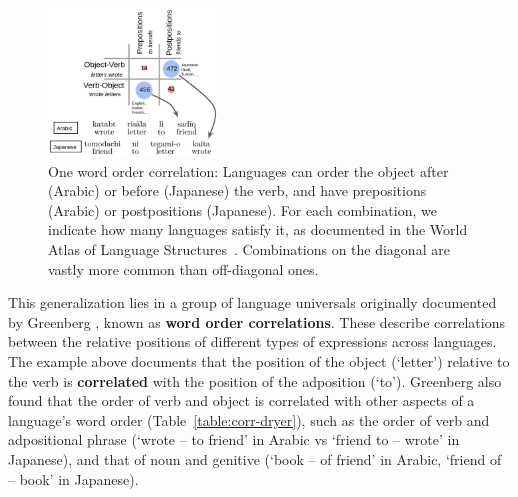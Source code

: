 \documentclass[9pt,twocolumn,twoside,lineno]{pnas-new}
\newcommand{\key}[1]{\textbf{#1}}
\begin{document}
\begin{figure}
    \centering
    \includegraphics[width=0.4\textwidth]{figure1.pdf}
\caption{ One word order correlation: Languages can order the object after (Arabic) or before (Japanese) the verb, and have prepositions (Arabic) or postpositions (Japanese). For each combination, we indicate how many languages satisfy it, as documented in the World Atlas of Language Structures~\cite{wals}. Combinations on the diagonal are vastly more common than off-diagonal ones. 
	}\label{fig:arabic-japanese-simple}	\label{fig:corr-table}
\end{figure}


This generalization lies in a group of language universals originally documented by Greenberg \cite{greenberg1963universals}, known as \key{word order correlations}.
These describe correlations between the relative positions of different types of expressions across languages.
The example above documents that the position of the object (`letter') relative to the verb is \key{correlated} with the position of the adposition (`to'). %
Greenberg also found that the order of verb and object is correlated with other aspects of a language's word order (Table~\ref{table:corr-dryer}), such as the order of verb and adpositional phrase (`wrote -- to friend' in Arabic vs `friend to -- wrote' in Japanese), and that of noun and genitive (`book -- of friend' in Arabic, `friend of -- book' in Japanese).
\end{document}
